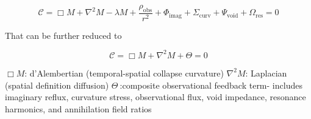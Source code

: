 \begin{tcolorbox}[colback=black!3!white,colframe=purple!80!white,title=\textbf{Collapse Law Alpha: The Fundamental Dynamic of Recursive Field Evolution}]
  \begin{equation}
  \boxed{
  \mathcal{C} = \Box M 
  + \nabla^2 M 
  - \lambda M 
  + \frac{\rho_{\text{obs}}}{r^2} 
  + \Phi_{\text{imag}} 
  + \Sigma_{\text{curv}} 
  + \Psi_{\text{void}} 
  + \Omega_{\text{res}} 
  = 0
  }
  \end{equation}
\end{tcolorbox}
  
That can be further reduced to 

\begin{tcolorbox}[
  colback=white,
  colframe=purple,
  coltitle=black,
  coltext=black,
  title=\textbf{Collapse Law Alpha (Symbolic Form)}
]
\begin{equation}
\boxed{
  \mathcal{C} = \Box M + \nabla^2 M + \Theta = 0
}
\end{equation}
\end{tcolorbox}

$\Box M$: d'Alembertian (temporal-spatial collapse curvature)
$\nabla^2 M$: Laplacian (spatial definition diffusion)
$\Theta\ $:composite observational feedback term- includes imaginary reflux, curvature stress, observational flux, void impedance, resonance harmonics, and annihilation field ratios

\nocite{*}
\printbibliography[title={Appendix K References}, keyword=chapter12]